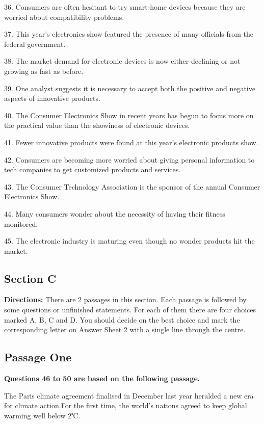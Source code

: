 \documentclass[UTF8,11pt]{ctexart}
\begin{document}
36. Consumers are often hesitant to try smart-home devices because they are worried about compatibility problems.


37. This year's electronics show featured the presence of many officials from the federal government.


38. The market demand for electronic devices is now either declining or not growing as fast as before.


39. One analyst suggests it is necessary to accept both the positive and negative aspects of innovative products.


40. The Consumer Electronics Show in recent years has begun to focus more on the practical value than the showiness of electronic devices.


41. Fewer innovative products were found at this year's electronic products show.


42. Consumers are becoming more worried about giving personal information to tech companies to get customized products and services.


43. The Consumer Technology Association is the sponsor of the annual Consumer Electronics Show.


44. Many consumers wonder about the necessity of having their fitness monitored.


45. The electronic industry is maturing even though no wonder products hit the market.


\subsection*{\textbf{Section C}}


\textbf{Directions:} There are 2 passages in this section. Each passage is followed by some questions or unfinished statements. For each of them there are four choices marked A, B, C and D. You should decide on the best choice and mark the corresponding letter on Answer Sheet 2 with a single line through the centre.


\subsection*{\textbf{Passage One}}


\textbf{Questions 46 to 50 are based on the following passage.}


The Paris climate agreement finalised in December last year heralded a new era for climate action.For the first time, the world's nations agreed to keep global warming well below 2℃.
\end{document}
